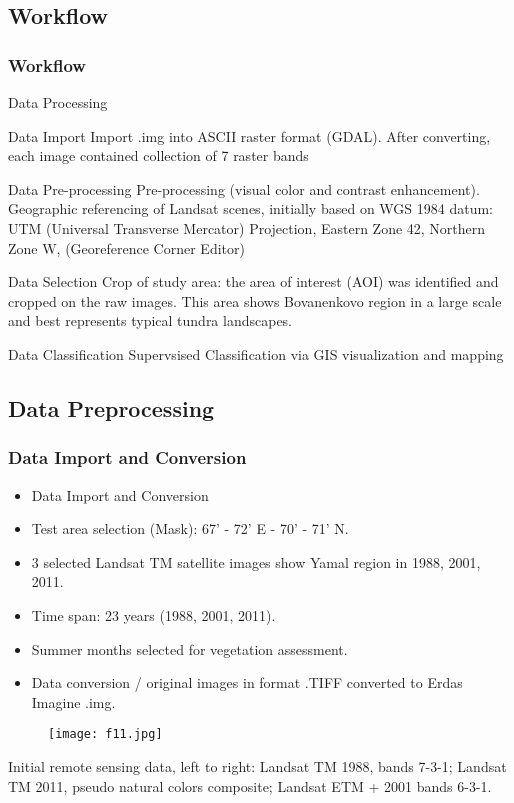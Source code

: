 \documentclass[pdflatex,compress,8pt,
	xcolor={dvipsnames,dvipsnames,svgnames,x11names,table},
	hyperref={colorlinks = true,breaklinks = true, urlcolor = NavyBlue, breaklinks = true}]{beamer}
\begin{document}
\subsection{Workflow}
\begin{frame}\frametitle{Workflow}
Data Processing

\begin{alertblock}{Data Import}
Import .img into ASCII raster format (GDAL). After converting, each image contained collection of 7 raster bands
\end{alertblock}

\begin{block}{Data Pre-processing}
Pre-processing (visual color and contrast enhancement). Geographic referencing of Landsat scenes, initially based on  WGS 1984 datum: UTM (Universal Transverse Mercator) Projection, Eastern Zone 42, Northern Zone W, (Georeference Corner Editor)
\end{block}

\begin{block}{Data Selection}
Crop of study area: the area of interest (AOI) was identified and cropped on the raw images. This area shows Bovanenkovo region in a large scale and best represents typical tundra landscapes.
\end{block}

\begin{alertblock}{Data Classification}
Supervsised Classification via GIS visualization and mapping
\end{alertblock}

\end{frame}

\subsection{Data Preprocessing}
\begin{frame}\frametitle{Data Import and Conversion}
\begin{itemize}
	\item Data Import and Conversion
        \item Test area selection (Mask): 67' - 72' E - 70' - 71' N. 
	\item 3 selected  Landsat TM satellite images show Yamal region in 1988, 2001, 2011.
	\item Time span: 23 years (1988, 2001, 2011). 
	\item Summer months selected for vegetation assessment. 
	\item Data conversion / original images in format .TIFF converted to Erdas Imagine .img.
\end{itemize}
\begin{figure}[H]
	\centering
		\texttt{[image: f11.jpg]}
\end{figure}
Initial remote sensing data, left to right: Landsat TM 1988, bands 7-3-1; Landsat TM 2011, pseudo natural colors composite; Landsat ETM + 2001 bands 6-3-1.
\end{frame}
\end{document}
